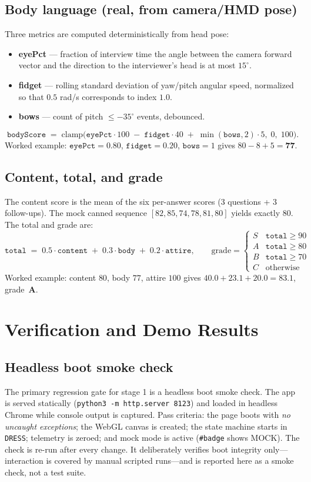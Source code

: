 \documentclass[10pt,a4paper]{article}
\begin{document}
\subsection{Body language (real, from camera/HMD pose)}
Three metrics are computed deterministically from head pose:
\begin{itemize}[leftmargin=1.6em,itemsep=1pt]
  \item \textbf{eyePct} --- fraction of interview time the angle between the camera forward vector and the direction to the interviewer's head is at most $15^\circ$.
  \item \textbf{fidget} --- rolling standard deviation of yaw/pitch angular speed, normalized so that $0.5$ rad/s corresponds to index $1.0$.
  \item \textbf{bows} --- count of pitch $\leq -35^\circ$ events, debounced.
\end{itemize}
\[
\texttt{bodyScore} \;=\; \mathrm{clamp}\!\big(\texttt{eyePct}\cdot 100 \;-\; \texttt{fidget}\cdot 40 \;+\; \min(\texttt{bows},2)\cdot 5,\; 0,\; 100\big).
\]
Worked example: $\texttt{eyePct}=0.80$, $\texttt{fidget}=0.20$, $\texttt{bows}=1$ gives $80-8+5 = \mathbf{77}$.

\subsection{Content, total, and grade}
The content score is the mean of the six per-answer scores (3 questions + 3 follow-ups). The mock canned sequence $[82,85,74,78,81,80]$ yields exactly $80$. The total and grade are:
\[
\texttt{total} \;=\; 0.5\cdot\texttt{content} \;+\; 0.3\cdot\texttt{body} \;+\; 0.2\cdot\texttt{attire},
\qquad
\text{grade} =
\begin{cases}
S & \texttt{total} \geq 90\\
A & \texttt{total} \geq 80\\
B & \texttt{total} \geq 70\\
C & \text{otherwise}
\end{cases}
\]
Worked example: content $80$, body $77$, attire $100$ gives $40.0 + 23.1 + 20.0 = \mathbf{83.1}$, grade~\textbf{A}.

\section{Verification and Demo Results}
\subsection{Headless boot smoke check}
The primary regression gate for stage 1 is a headless boot smoke check. The app is served statically (\texttt{python3 -m http.server 8123}) and loaded in headless Chrome while console output is captured. Pass criteria: the page boots with \emph{no uncaught exceptions}; the WebGL canvas is created; the state machine starts in \texttt{DRESS}; telemetry is zeroed; and mock mode is active (\texttt{\#badge} shows MOCK). The check is re-run after every change. It deliberately verifies boot integrity only---interaction is covered by manual scripted runs---and is reported here as a smoke check, not a test suite.
\end{document}
